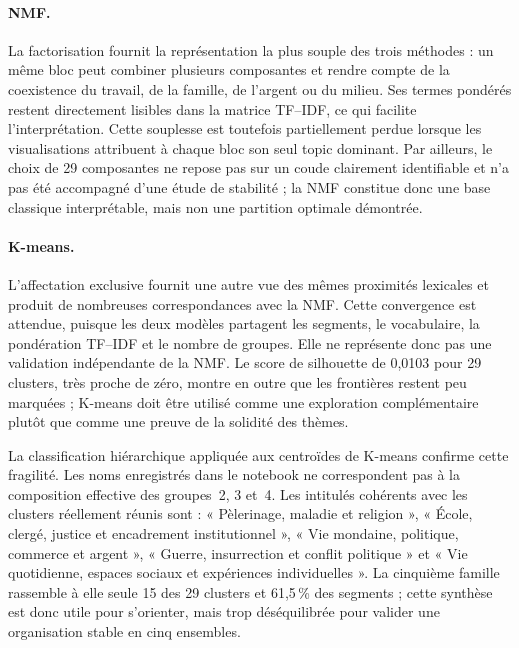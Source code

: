 \paragraph{NMF.} La factorisation fournit la représentation la plus souple des trois méthodes : un même bloc peut combiner plusieurs composantes et rendre compte de la coexistence du travail, de la famille, de l'argent ou du milieu. Ses termes pondérés restent directement lisibles dans la matrice TF--IDF, ce qui facilite l'interprétation. Cette souplesse est toutefois partiellement perdue lorsque les visualisations attribuent à chaque bloc son seul topic dominant. Par ailleurs, le choix de 29 composantes ne repose pas sur un coude clairement identifiable et n'a pas été accompagné d'une étude de stabilité ; la NMF constitue donc une base classique interprétable, mais non une partition optimale démontrée.

\paragraph{K-means.} L'affectation exclusive fournit une autre vue des mêmes proximités lexicales et produit de nombreuses correspondances avec la NMF. Cette convergence est attendue, puisque les deux modèles partagent les segments, le vocabulaire, la pondération TF--IDF et le nombre de groupes. Elle ne représente donc pas une validation indépendante de la NMF. Le score de silhouette de 0,0103 pour 29 clusters, très proche de zéro, montre en outre que les frontières restent peu marquées ; K-means doit être utilisé comme une exploration complémentaire plutôt que comme une preuve de la solidité des thèmes.

La classification hiérarchique appliquée aux centroïdes de K-means confirme cette fragilité. Les noms enregistrés dans le notebook ne correspondent pas à la composition effective des groupes~2, 3 et~4. Les intitulés cohérents avec les clusters réellement réunis sont : « Pèlerinage, maladie et religion », « École, clergé, justice et encadrement institutionnel », « Vie mondaine, politique, commerce et argent », « Guerre, insurrection et conflit politique » et « Vie quotidienne, espaces sociaux et expériences individuelles ». La cinquième famille rassemble à elle seule 15 des 29 clusters et 61,5\,\% des segments ; cette synthèse est donc utile pour s'orienter, mais trop déséquilibrée pour valider une organisation stable en cinq ensembles.

